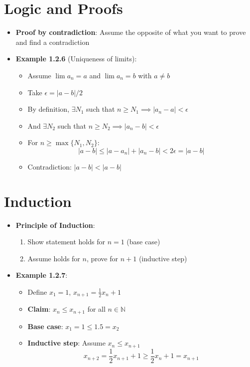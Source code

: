 \documentclass{article}
\begin{document}
\section{Logic and Proofs}
\begin{itemize}
    \item \textbf{Proof by contradiction}: Assume the opposite of what you want to prove and find a contradiction
    
    \item \textbf{Example 1.2.6} (Uniqueness of limits):
    \begin{itemize}
        \item Assume $\lim a_n = a$ and $\lim a_n = b$ with $a \neq b$
        \item Take $\epsilon = |a - b|/2$
        \item By definition, $\exists N_1$ such that $n \geq N_1 \implies |a_n - a| < \epsilon$
        \item And $\exists N_2$ such that $n \geq N_2 \implies |a_n - b| < \epsilon$
        \item For $n \geq \max\{N_1, N_2\}$:
        \[
        |a - b| \leq |a - a_n| + |a_n - b| < 2\epsilon = |a - b|
        \]
        \item Contradiction: $|a - b| < |a - b|$
    \end{itemize}
\end{itemize}

\section{Induction}
\begin{itemize}
    \item \textbf{Principle of Induction}:
    \begin{enumerate}
        \item Show statement holds for $n = 1$ (base case)
        \item Assume holds for $n$, prove for $n + 1$ (inductive step)
    \end{enumerate}
    
    \item \textbf{Example 1.2.7}:
    \begin{itemize}
        \item Define $x_1 = 1$, $x_{n+1} = \frac{1}{2}x_n + 1$
        \item \textbf{Claim}: $x_n \leq x_{n+1}$ for all $n \in \mathbb{N}$
        \item \textbf{Base case}: $x_1 = 1 \leq 1.5 = x_2$
        \item \textbf{Inductive step}: Assume $x_n \leq x_{n+1}$
        \[
        x_{n+2} = \frac{1}{2}x_{n+1} + 1 \geq \frac{1}{2}x_n + 1 = x_{n+1}
        \]
    \end{itemize}
\end{itemize}
\end{document}
